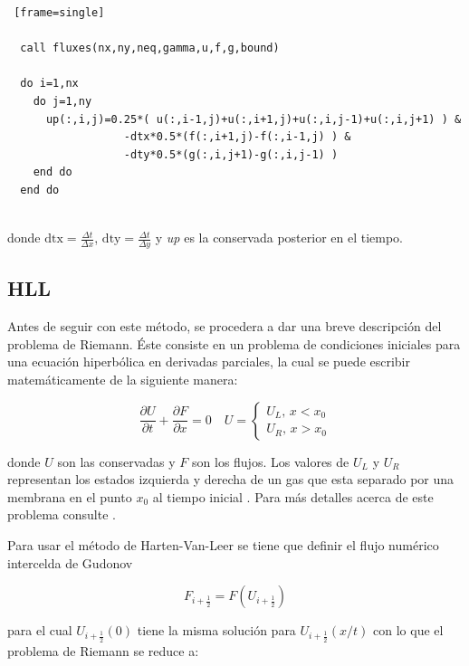 \documentclass[12pt,a4paper]{book}
\begin{document}
\begin{lstlisting} [frame=single]

  call fluxes(nx,ny,neq,gamma,u,f,g,bound)

  do i=1,nx
    do j=1,ny
      up(:,i,j)=0.25*( u(:,i-1,j)+u(:,i+1,j)+u(:,i,j-1)+u(:,i,j+1) ) &
                  -dtx*0.5*(f(:,i+1,j)-f(:,i-1,j) ) &
                  -dty*0.5*(g(:,i,j+1)-g(:,i,j-1) )
    end do
  end do
  
\end{lstlisting}

\noindent donde $\text{dtx} = \frac{\Delta t}{\Delta x}$, $\text{dty} = \frac{\Delta t}{\Delta y}$ y \emph{up} es la conservada posterior en el tiempo.



\subsection{HLL} \label{secc:HLL}
Antes de seguir con este método, se procedera a dar una breve descripción del problema de Riemann. Éste consiste en un problema de condiciones iniciales para una ecuación hiperbólica en derivadas parciales, la cual
se puede escribir matemáticamente de la siguiente manera: 

\begin{equation}
  \frac{\partial U}{\partial t}+\frac{\partial F}{\partial x}=0 \quad U=\left\{\begin{array}{l}
  U_{L}, \, x<x_{0} \\
  U_{R}, \, x>x_{0} 
  \end{array}\right.
\end{equation}

\noindent donde $U$ son las conservadas y $F$ son los flujos. Los valores de $U_{L}$ y $U_{R}$ representan los estados izquierda y derecha de un gas que esta separado por una membrana en el punto $x_0$ al tiempo 
inicial \citep{Lora2013}.
Para más detalles acerca de este problema consulte \citet{Toro1997}.



	Para usar el método de Harten-Van-Leer \citep{Toro1997} se tiene que definir el flujo numérico intercelda de Gudonov

\begin{equation}
F_{i+\frac{1}{2}}=F \left( U_{i+\frac{1}{2}} \right)
\end{equation}

\noindent para el cual $U_{i+\frac{1}{2}}(0)$ tiene la misma solución para $U_{i+\frac{1}{2}}(x/t)$ con lo que el problema de Riemann se reduce a:
\end{document}
